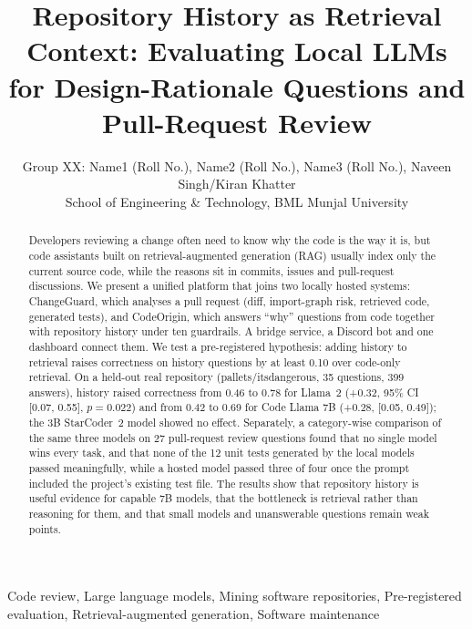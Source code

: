 \documentclass[12pt,onecolumn,draftclsnofoot]{IEEEtran}
\begin{document}
\title{Repository History as Retrieval Context: Evaluating Local LLMs for Design-Rationale Questions and Pull-Request Review}

\author{Group XX: Name1 (Roll No.), Name2 (Roll No.), Name3 (Roll No.), Naveen Singh/Kiran Khatter\\
School of Engineering \& Technology, BML Munjal University}

\maketitle

\begin{abstract}
Developers reviewing a change often need to know why the code is the way it is, but code assistants built on retrieval-augmented generation (RAG) usually index only the current source code, while the reasons sit in commits, issues and pull-request discussions. We present a unified platform that joins two locally hosted systems: ChangeGuard, which analyses a pull request (diff, import-graph risk, retrieved code, generated tests), and CodeOrigin, which answers ``why'' questions from code together with repository history under ten guardrails. A bridge service, a Discord bot and one dashboard connect them. We test a pre-registered hypothesis: adding history to retrieval raises correctness on history questions by at least 0.10 over code-only retrieval. On a held-out real repository (pallets/itsdangerous, 35 questions, 399 answers), history raised correctness from 0.46 to 0.78 for Llama~2 (+0.32, 95\% CI [0.07, 0.55], $p=0.022$) and from 0.42 to 0.69 for Code Llama 7B (+0.28, [0.05, 0.49]); the 3B StarCoder~2 model showed no effect. Separately, a category-wise comparison of the same three models on 27 pull-request review questions found that no single model wins every task, and that none of the 12 unit tests generated by the local models passed meaningfully, while a hosted model passed three of four once the prompt included the project's existing test file. The results show that repository history is useful evidence for capable 7B models, that the bottleneck is retrieval rather than reasoning for them, and that small models and unanswerable questions remain weak points.
\end{abstract}

\begin{IEEEkeywords}
Code review, Large language models, Mining software repositories, Pre-registered evaluation, Retrieval-augmented generation, Software maintenance
\end{IEEEkeywords}
\end{document}
